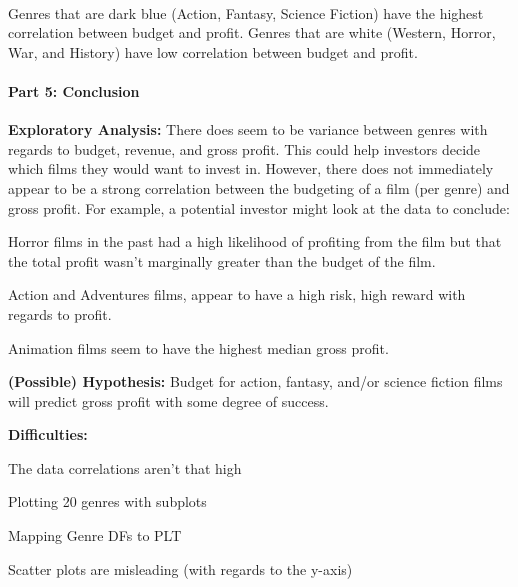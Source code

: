 \documentclass[11pt]{article}
\begin{document}
    \begin{center}
    \end{center}
    { \hspace*{\fill} \\}
    
    Genres that are dark blue (Action, Fantasy, Science Fiction) have the
highest correlation between budget and profit. Genres that are white
(Western, Horror, War, and History) have low correlation between budget
and profit.

    \paragraph{Part 5: Conclusion}\label{part-5-conclusion}

    \textbf{Exploratory Analysis:} There does seem to be variance between
genres with regards to budget, revenue, and gross profit. This could
help investors decide which films they would want to invest in. However,
there does not immediately appear to be a strong correlation between the
budgeting of a film (per genre) and gross profit. For example, a
potential investor might look at the data to conclude:

Horror films in the past had a high likelihood of profiting from the
film but that the total profit wasn't marginally greater than the budget
of the film.

Action and Adventures films, appear to have a high risk, high reward
with regards to profit.

Animation films seem to have the highest median gross profit.

    \textbf{(Possible) Hypothesis:} Budget for action, fantasy, and/or
science fiction films will predict gross profit with some degree of
success.

    \textbf{Difficulties:}

The data correlations aren't that high

Plotting 20 genres with subplots

Mapping Genre DFs to PLT

Scatter plots are misleading (with regards to the y-axis)


    
    
    
    
\end{document}
